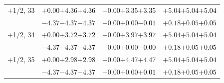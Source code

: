 \documentclass[compress]{beamer}
\begin{document}
\begin{frame}
\begin{tabular}{r | c | c | c}
$+$1/2, 33 & $+0.00$\hspace{0.1 cm}$+4.36$\hspace{0.1 cm}\textcolor{black}{$+4.36$} & $+0.00$\hspace{0.1 cm}$+3.35$\hspace{0.1 cm}\textcolor{black}{$+3.35$} & $+5.04$\hspace{0.1 cm}$+5.04$\hspace{0.1 cm}\textcolor{black}{$+5.04$} \\
           & $-4.37$\hspace{0.1 cm}$-4.37$\hspace{0.1 cm}\textcolor{black}{$-4.37$} & $+0.00$\hspace{0.1 cm}$+0.00$\hspace{0.1 cm}\textcolor{black}{$-0.01$} & $+0.18$\hspace{0.1 cm}$+0.05$\hspace{0.1 cm}\textcolor{black}{$+0.05$} \\
$+$1/2, 34 & $+0.00$\hspace{0.1 cm}$+3.72$\hspace{0.1 cm}\textcolor{black}{$+3.72$} & $+0.00$\hspace{0.1 cm}$+3.97$\hspace{0.1 cm}\textcolor{black}{$+3.97$} & $+5.04$\hspace{0.1 cm}$+5.04$\hspace{0.1 cm}\textcolor{black}{$+5.04$} \\
           & $-4.37$\hspace{0.1 cm}$-4.37$\hspace{0.1 cm}\textcolor{black}{$-4.37$} & $+0.00$\hspace{0.1 cm}$+0.00$\hspace{0.1 cm}\textcolor{black}{$-0.00$} & $+0.18$\hspace{0.1 cm}$+0.05$\hspace{0.1 cm}\textcolor{black}{$+0.05$} \\
$+$1/2, 35 & $+0.00$\hspace{0.1 cm}$+2.98$\hspace{0.1 cm}\textcolor{black}{$+2.98$} & $+0.00$\hspace{0.1 cm}$+4.47$\hspace{0.1 cm}\textcolor{black}{$+4.47$} & $+5.04$\hspace{0.1 cm}$+5.04$\hspace{0.1 cm}\textcolor{black}{$+5.04$} \\
           & $-4.37$\hspace{0.1 cm}$-4.37$\hspace{0.1 cm}\textcolor{black}{$-4.37$} & $+0.00$\hspace{0.1 cm}$+0.00$\hspace{0.1 cm}\textcolor{black}{$+0.01$} & $+0.18$\hspace{0.1 cm}$+0.05$\hspace{0.1 cm}\textcolor{black}{$+0.05$} \\

\end{tabular}
\end{frame}
\end{document}
